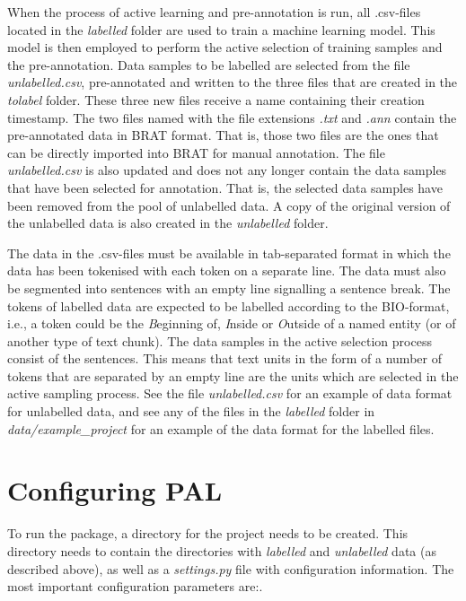 \documentclass{report}
\newcommand{\mariascomment}[1]{{#1}}
\begin{document}
When the process of active learning and pre-annotation is run, all .csv-files located in the \emph{labelled} folder are used to train a machine learning model. This model is then \mariascomment{employed to perform} the active selection of training samples and the pre-annotation. Data samples to be labelled are selected from the file \emph{unlabelled.csv}, pre-annotated and written to the three files that are created in the \emph{tolabel} folder. These three new files receive a name containing their creation timestamp. The two files named with the file extensions \emph{.txt} and \emph{.ann} contain the pre-annotated data in BRAT format. That is, those two files are the ones that can be directly imported into BRAT for manual annotation. The file \emph{unlabelled.csv} is also updated and does not any longer contain the data samples that have been selected for annotation. That is, the selected data samples have been removed from the pool of unlabelled data. A copy of the original version of the unlabelled data is also created in the \emph{unlabelled} folder.

The data in the .csv-files must be available in tab-separated format in which the data has been tokenised with each token on a separate line. The data must also be segmented into sentences with an empty line signalling a sentence break.  The tokens of labelled data are expected to be labelled according to the BIO-format, i.e.,  a token could be the \emph{B}eginning of, \emph{I}nside or \emph{O}utside of a named entity (or of another type of text chunk). The data samples in the active selection process consist of the sentences. This means that text units in the form of a number of tokens that are separated by an empty line are the units which are selected in the active sampling process. See the file \emph{unlabelled.csv} for an example of data format for unlabelled data, and see any of the files in the \emph{labelled} folder in  \emph{data/example\_project} for an example of the data format for the labelled files. 



\section*{Configuring PAL}
\label{setting}
To run the package, a directory for the project needs to be created. This directory needs to contain the directories with \emph{labelled} and \emph{unlabelled} data (as described above), as well as a \mariascomment{\emph{settings.py} file with configuration information. The most important configuration parameters are:}.
\end{document}
